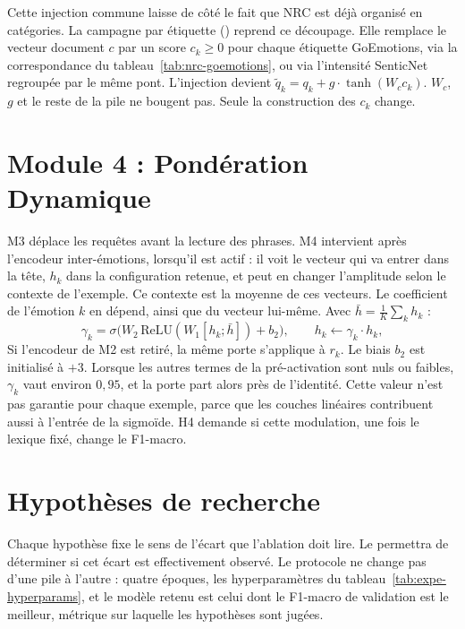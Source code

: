 Cette injection commune laisse de côté le fait que NRC est déjà organisé
en catégories. La campagne par étiquette
() reprend ce découpage. Elle remplace le
vecteur document $c$ par un score $c_k \geq 0$ pour chaque étiquette
GoEmotions, via la correspondance du tableau~\ref{tab:nrc-goemotions}, ou
via l'intensité SenticNet regroupée par le même pont. L'injection devient
$\tilde{q}_k = q_k + g \cdot \tanh(W_c c_k)$. $W_c$, $g$ et le reste de la
pile ne bougent pas. Seule la construction des $c_k$ change.

\section{Module 4 : Pondération Dynamique}
\label{sec:conception-m4}

M3 déplace les requêtes avant la lecture des phrases. M4 intervient
après l'encodeur inter-émotions, lorsqu'il est actif : il voit le vecteur
qui va entrer dans la tête, $h_k$ dans la configuration retenue, et peut
en changer l'amplitude selon le contexte de l'exemple. Ce contexte est la
moyenne de ces vecteurs. Le coefficient de l'émotion $k$ en dépend, ainsi
que du vecteur lui-même. Avec $\bar{h} = \frac{1}{K}\sum_k h_k$ :
\begin{equation}
\gamma_k = \sigma\!\big(W_2\,\mathrm{ReLU}(W_1 [h_k ; \bar{h}]) + b_2\big),
\qquad h_k \leftarrow \gamma_k \cdot h_k,
\label{eq:dyngate}
\end{equation}
Si l'encodeur de M2 est retiré, la même porte s'applique à $r_k$.
Le biais $b_2$ est initialisé à $+3$. Lorsque les autres termes de la
pré-activation sont nuls ou faibles, $\gamma_k$ vaut environ $0{,}95$,
et la porte part alors près de l'identité. Cette valeur n'est pas
garantie pour chaque exemple, parce que les couches linéaires
contribuent aussi à l'entrée de la sigmoïde. H4 demande si cette
modulation, une fois le lexique fixé, change le F1-macro.

\section{Hypothèses de recherche}
\label{sec:conception-hypotheses}

Chaque hypothèse fixe le sens de l'écart que l'ablation doit lire. Le
 permettra de déterminer si cet écart est
effectivement observé. Le protocole ne change pas d'une pile à l'autre :
quatre époques, les hyperparamètres du tableau~\ref{tab:expe-hyperparams},
et le modèle retenu est celui dont le F1-macro de validation est le
meilleur, métrique sur laquelle les hypothèses sont jugées.


